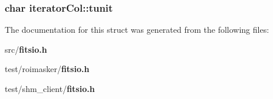 \subsubsection{\setlength{\rightskip}{0pt plus 5cm}char \bf{iterator\-Col::tunit}}\label{structiteratorCol_27b2e75fa7e805013c9a24e0a5127b42}




The documentation for this struct was generated from the following files:\begin{CompactItemize}
\item 
src/\bf{fitsio.h}\item 
test/roimasker/\bf{fitsio.h}\item 
test/shm\_\-client/\bf{fitsio.h}\end{CompactItemize}

